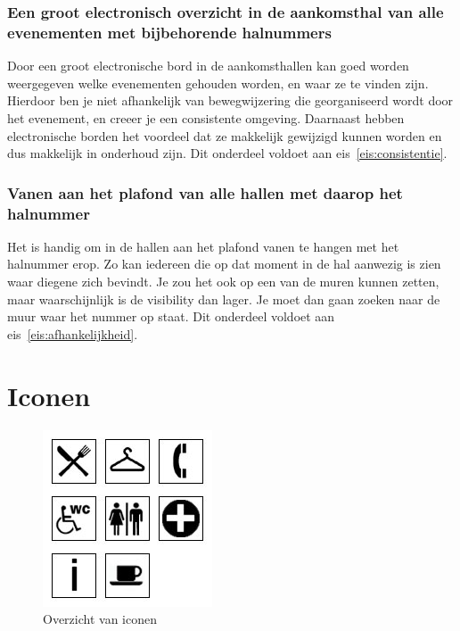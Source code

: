 \subsubsection{Een groot electronisch overzicht in de aankomsthal van alle evenementen met bijbehorende halnummers}

Door een groot electronische bord in de aankomsthallen kan goed worden weergegeven welke evenementen gehouden worden, en waar ze te vinden zijn. Hierdoor ben je niet afhankelijk van bewegwijzering die georganiseerd wordt door het evenement, en creeer je een consistente omgeving. Daarnaast hebben electronische borden het voordeel dat ze makkelijk gewijzigd kunnen worden en dus makkelijk in onderhoud zijn. Dit onderdeel voldoet aan eis~\ref{eis:consistentie}.


\subsubsection{Vanen aan het plafond van alle hallen met daarop het halnummer}

Het is handig om in de hallen aan het plafond vanen te hangen met het halnummer erop. Zo kan iedereen die op dat moment in de hal aanwezig is zien waar diegene zich bevindt. Je zou het ook op een van de muren kunnen zetten, maar waarschijnlijk is de visibility dan lager. Je moet dan gaan zoeken naar de muur waar het nummer op staat. Dit onderdeel voldoet aan eis~\ref{eis:afhankelijkheid}.


\section{Iconen}

\begin{figure}
\begin{center}
\includegraphics{images/iconen.jpg}
\end{center}
\caption{Overzicht van iconen}
\label{figuur:iconen}
\end{figure}

